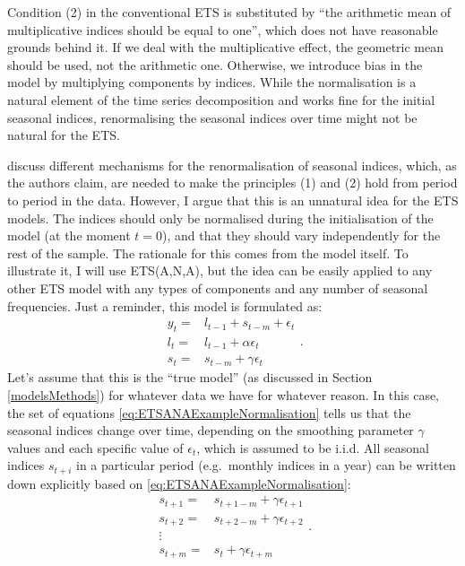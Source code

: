 \documentclass[
]{book}
\theoremstyle{definition}
\theoremstyle{definition}
\theoremstyle{definition}
\theoremstyle{definition}
\theoremstyle{remark}
\begin{document}
Condition (2) in the conventional ETS is substituted by ``the arithmetic mean of multiplicative indices should be equal to one'', which does not have reasonable grounds behind it. If we deal with the multiplicative effect, the geometric mean should be used, not the arithmetic one. Otherwise, we introduce bias in the model by multiplying components by indices. While the normalisation is a natural element of the time series decomposition and works fine for the initial seasonal indices, renormalising the seasonal indices over time might not be natural for the ETS.

\citet{Hyndman2008b} discuss different mechanisms for the renormalisation of seasonal indices, which, as the authors claim, are needed to make the principles (1) and (2) hold from period to period in the data. However, I argue that this is an unnatural idea for the ETS models. The indices should only be normalised during the initialisation of the model (at the moment \(t=0\)), and that they should vary independently for the rest of the sample. The rationale for this comes from the model itself. To illustrate it, I will use ETS(A,N,A), but the idea can be easily applied to any other ETS model with any types of components and any number of seasonal frequencies. Just a reminder, this model is formulated as:
\begin{equation}
  \begin{aligned}
  y_t = &l_{t-1} + s_{t-m} + \epsilon_t \\
  {l}_{t} = &l_{t-1} + \alpha\epsilon_t \\
  s_t = &s_{t-m} + \gamma\epsilon_t
  \end{aligned}.
  \label{eq:ETSANAExampleNormalisation}
\end{equation}
Let's assume that this is the ``true model'' (as discussed in Section \ref{modelsMethods}) for whatever data we have for whatever reason. In this case, the set of equations \eqref{eq:ETSANAExampleNormalisation} tells us that the seasonal indices change over time, depending on the smoothing parameter \(\gamma\) values and each specific value of \(\epsilon_t\), which is assumed to be i.i.d. All seasonal indices \(s_{t+i}\) in a particular period (e.g.~monthly indices in a year) can be written down explicitly based on \eqref{eq:ETSANAExampleNormalisation}:
\begin{equation}
  \begin{aligned}
  s_{t+1} = &s_{t+1-m} + \gamma\epsilon_{t+1} \\
  s_{t+2} = &s_{t+2-m} + \gamma\epsilon_{t+2} \\
  \vdots \\
  s_{t+m} = &s_{t} + \gamma\epsilon_{t+m}
  \end{aligned}.
  \label{eq:ETSANAExampleNormalisationIndices01}
\end{equation}
\end{document}
